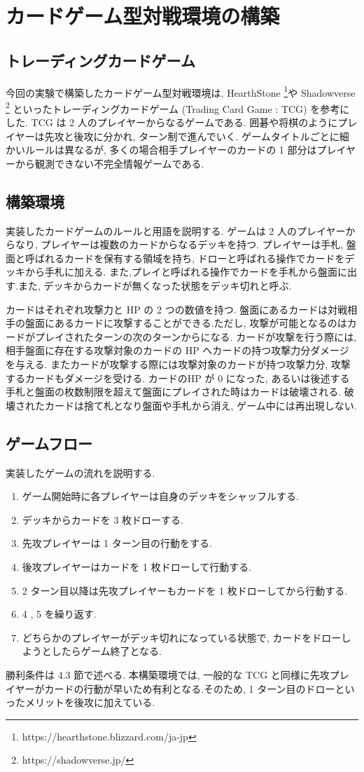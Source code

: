 \documentclass[twocolumn]{jarticle}
\begin{document}
\section{カードゲーム型対戦環境の構築}
\subsection{トレーディングカードゲーム}
今回の実験で構築したカードゲーム型対戦環境は, HearthStone \footnote[1]{https://hearthstone.blizzard.com/ja-jp}や Shadowverse \footnote[2]{https://shadowverse.jp/} といったトレーディングカードゲーム (Trading Card Game : TCG) を参考にした. TCG は 2 人のプレイヤーからなるゲームである. 囲碁や将棋のようにプレイヤーは先攻と後攻に分かれ, ターン制で進んでいく. 
ゲームタイトルごとに細かいルールは異なるが, 多くの場合相手プレイヤーのカードの 1 部分はプレイヤーから観測できない不完全情報ゲームである.

\subsection{構築環境}
実装したカードゲームのルールと用語を説明する.
ゲームは 2 人のプレイヤーからなり, プレイヤーは複数のカードからなるデッキを持つ.
プレイヤーは手札, 盤面と呼ばれるカードを保有する領域を持ち, ドローと呼ばれる操作でカードをデッキから手札に加える. また,プレイと呼ばれる操作でカードを手札から盤面に出す.また, デッキからカードが無くなった状態をデッキ切れと呼ぶ.
\par
カードはそれぞれ攻撃力と HP の 2 つの数値を持つ. 盤面にあるカードは対戦相手の盤面にあるカードに攻撃することができる.ただし, 攻撃が可能となるのはカードがプレイされたターンの次のターンからになる. カードが攻撃を行う際には, 相手盤面に存在する攻撃対象のカードの HP へカードの持つ攻撃力分ダメージを与える. またカードが攻撃する際には攻撃対象のカードが持つ攻撃力分, 攻撃するカードもダメージを受ける.
カードのHP が 0 になった, あるいは後述する手札と盤面の枚数制限を超えて盤面にプレイされた時はカードは破壊される. 破壊されたカードは捨て札となり盤面や手札から消え, ゲーム中には再出現しない. 
\subsection{ゲームフロー}
実装したゲームの流れを説明する.
\begin{enumerate}
  \setlength{\itemsep}{0cm} %
  \item ゲーム開始時に各プレイヤーは自身のデッキをシャッフルする.
  \item デッキからカードを 3 枚ドローする.
  \item 先攻プレイヤーは 1 ターン目の行動をする.
  \item 後攻プレイヤーはカードを 1 枚ドローして行動する.
  \item 2 ターン目以降は先攻プレイヤーもカードを 1 枚ドローしてから行動する.
  \item 4 , 5 を繰り返す.
  \item どちらかのプレイヤーがデッキ切れになっている状態で, カードをドローしようとしたらゲーム終了となる.
\end{enumerate}
勝利条件は 4.3 節で述べる.
本構築環境では, 一般的な TCG と同様に先攻プレイヤーがカードの行動が早いため有利となる.そのため, 1 ターン目のドローといったメリットを後攻に加えている. 
\end{document}
